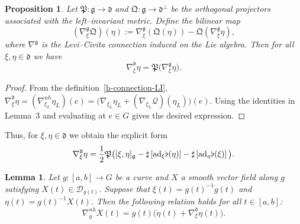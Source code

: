 \documentclass[letterpaper, 10 pt, conference]{ieeeconf}
\newtheorem{proposition}{Proposition}
\newtheorem{lemma}{Lemma}
\newcommand{\g}{\mathfrak{g}}
\newcommand{\h}{\mathfrak{d}}
\newcommand{\D}{\mathcal{D}}
\newcommand{\ad}{\normalfont{\text{ad}}}
\begin{document}
\begin{proposition}
Let $\mathfrak{P}:\g\to\h$ and $\mathfrak{Q}:\g\to\h^\perp$ be the 
orthogonal projectors associated with the left--invariant metric.  
Define the bilinear map
\[
(\nabla^{\g}_{\xi}\mathfrak{Q})(\eta)
:= \nabla^{\g}_{\xi}(\mathfrak{Q}(\eta))
   - \mathfrak{Q}(\nabla^{\g}_{\xi}\eta),
\]
where $\nabla^\g$ is the Levi--Civita connection induced on the Lie algebra.  
Then for all $\xi,\eta\in\h$ we have
\begin{equation}\label{eqq1-left}
    \nabla^{\h}_{\xi}\eta 
    = \mathfrak{P}\big(\nabla^{\g}_{\xi}\eta\big).
\end{equation}
\end{proposition}

\begin{proof}
From the definition~\eqref{h-connection-LI}, $\nabla^\h_{\xi}\eta 
= (\nabla^{nh}_{\xi_L}\eta_L)(e)
= \big(\nabla_{\xi_L}\eta_L + (\nabla_{\xi_L}\mathcal{Q})(\eta_L)\big)(e)$. Using the identities in Lemma~$3$ and evaluating at 
$e\in G$ gives the desired expression.
\end{proof}

Thus, for $\xi,\eta\in\h$ we obtain the explicit form
\begin{equation}\label{hcon_decomp}
    \nabla^{\h}_{\xi} \eta 
    =\frac12 \mathfrak{P}\big([\xi, \eta]_\g 
       -\sharp\left[\ad_\xi \flat(\eta)\right]
    -\sharp \left[\ad_\eta \flat(\xi)\right]\big).
\end{equation}

\begin{lemma}\label{lemma: Horcov-to-covh-left}
Let $g: [a,b] \to G$ be a curve and $X$ a smooth vector field along $g$ 
satisfying $X(t)\in \D_{g(t)}$. 
Suppose that $\xi(t) = g(t)^{-1}\dot{g}(t)$ and $\eta(t) = g(t)^{-1} X(t)$. Then the following relation holds for all $t \in [a,b]$:
\begin{equation}\label{eq:Horcov-to-covh-left}
    \nabla^{nh}_{\dot{g}} X(t) 
    = g(t)\big(\dot{\eta}(t) + \nabla_{\xi}^{\h} \eta(t) \big).
\end{equation}
\end{lemma}

\end{document}
